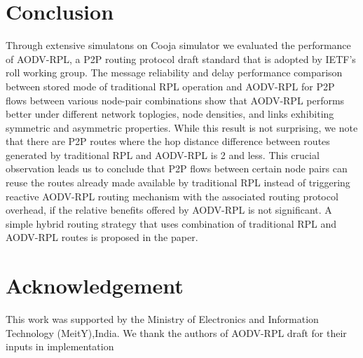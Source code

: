 \documentclass[conference, letterpaper]{IEEEtran}
\begin{document}
\section{Conclusion} \label{Section.V}

Through extensive simulatons on Cooja simulator we evaluated the performance of
AODV-RPL, a P2P routing protocol draft standard that is adopted by IETF's roll
working group. The message reliability and delay performance comparison between
stored mode of traditional RPL operation and AODV-RPL for P2P flows between
various node-pair combinations show that AODV-RPL performs better under
different network toplogies, node densities, and links exhibiting symmetric and
asymmetric properties. While this result is not surprising, we note that there
are P2P routes where the hop distance difference between routes generated by
traditional RPL and AODV-RPL is 2 and less. This crucial observation leads us to
conclude that P2P flows between certain node pairs can reuse the routes already
made available by traditional RPL instead of triggering reactive AODV-RPL
routing mechanism with the associated routing protocol overhead, if the relative
benefits offered by AODV-RPL is not significant. A simple hybrid routing
strategy that uses combination of traditional RPL and AODV-RPL routes is
proposed in the paper.

\section{Acknowledgement}

This work was supported  by the Ministry of Electronics and Information
Technology (MeitY),India. We thank the authors of AODV-RPL draft for their
inputs in implementation



\end{document}
